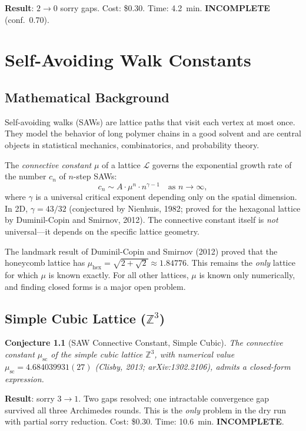 \documentclass[12pt,a4paper]{report}
\theoremstyle{plain}
\newtheorem{conjecture}[theorem]{Conjecture}
\theoremstyle{definition}
\theoremstyle{remark}
\newcommand{\verdict}[1]{\textbf{\textcolor{inkblue}{#1}}}
\newcommand{\Z}{\mathbb{Z}}
\begin{document}
\medskip
\noindent\textbf{Result}: $2 \to 0$ sorry gaps. Cost: \$0.30. Time: 4.2~min.
\verdict{INCOMPLETE} (conf.~0.70).

\chapter{Self-Avoiding Walk Constants}
\label{ch:saw}

\section{Mathematical Background}

Self-avoiding walks (SAWs) are lattice paths that visit each vertex at most once.
They model the behavior of long polymer chains in a good solvent and are central
objects in statistical mechanics, combinatorics, and probability theory.

The \emph{connective constant} $\mu$ of a lattice $\mathcal{L}$ governs the
exponential growth rate of the number $c_n$ of $n$-step SAWs:
\[
  c_n \sim A \cdot \mu^n \cdot n^{\gamma - 1} \quad \text{as } n \to \infty,
\]
where $\gamma$ is a universal critical exponent depending only on the spatial dimension.
In 2D, $\gamma = 43/32$ (conjectured by Nienhuis, 1982; proved for the hexagonal
lattice by Duminil-Copin and Smirnov, 2012). The connective constant itself is
\emph{not} universal—it depends on the specific lattice geometry.

The landmark result of Duminil-Copin and Smirnov (2012) proved that the honeycomb
lattice has $\mu_{\text{hex}} = \sqrt{2 + \sqrt{2}} \approx 1.84776$. This remains
the \emph{only} lattice for which $\mu$ is known exactly. For all other lattices,
$\mu$ is known only numerically, and finding closed forms is a major open problem.

\section{Simple Cubic Lattice ($\Z^3$)}

\begin{conjecture}[SAW Connective Constant, Simple Cubic]
The connective constant $\mu_{\text{sc}}$ of the simple cubic lattice $\Z^3$, with
numerical value $\mu_{\text{sc}} = 4.684039931(27)$ (Clisby, 2013; arXiv:1302.2106),
admits a closed-form expression.
\end{conjecture}

\noindent\textbf{Result}: sorry $3 \to 1$. Two gaps resolved; one intractable
convergence gap survived all three Archimedes rounds. This is the \emph{only} problem
in the dry run with partial sorry reduction. Cost: \$0.30. Time: 10.6~min.
\verdict{INCOMPLETE}.
\end{document}
